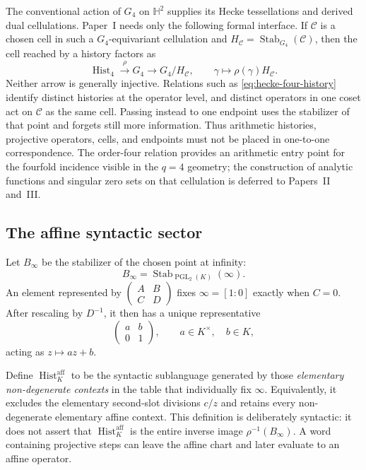 \begin{remark}
\label{rem:hecke-history-operator-coset}
The conventional action of $G_4$ on $\mathbb H^2$ supplies its Hecke
tessellations and derived dual cellulations.  Paper~I needs only the following
formal interface.  If $\mathcal C$ is a chosen cell in such a
$G_4$-equivariant cellulation and
\(H_{\mathcal C}=\operatorname{Stab}_{G_4}(\mathcal C)\), then the cell reached
by a history factors as
\begin{equation}
  \operatorname{Hist}_4
    \xrightarrow{\ \rho\ }G_4
    \longrightarrow G_4/H_{\mathcal C},
  \qquad
  \gamma\longmapsto\rho(\gamma)H_{\mathcal C}.
  \label{eq:hecke-history-coset-interface}
\end{equation}
Neither arrow is generally injective.  Relations such as
\eqref{eq:hecke-four-history} identify distinct histories at the operator
level, and distinct operators in one coset act on $\mathcal C$ as the same
cell.  Passing instead to one endpoint uses the stabilizer of that
point and forgets still more information.  Thus arithmetic histories,
projective operators, cells, and endpoints must not be placed in one-to-one
correspondence.  The order-four relation provides an arithmetic entry point
for the fourfold incidence visible in the $q=4$ geometry; the construction of
analytic functions and singular zero sets on that cellulation is deferred to
Papers~II and~III.
\end{remark}

\subsection{The affine syntactic sector}

Let $B_\infty$ be the stabilizer of the chosen point at infinity:
\[
  B_\infty
  =\operatorname{Stab}_{\operatorname{PGL}_2(K)}(\infty).
\]
An element represented by $\begin{pmatrix}A&B\\C&D\end{pmatrix}$ fixes
$\infty=[1:0]$ exactly when $C=0$.  After rescaling by $D^{-1}$, it then has a
unique representative
\[
  \begin{pmatrix}a&b\\0&1\end{pmatrix},
  \qquad a\in K^\times,\quad b\in K,
\]
acting as $z\mapsto az+b$.

Define $\operatorname{Hist}^{\mathrm{aff}}_K$ to be the syntactic sublanguage
generated by those \emph{elementary non-degenerate contexts} in the table that
individually fix $\infty$.  Equivalently, it excludes the elementary
second-slot divisions $c/z$ and retains every non-degenerate elementary affine
context.  This definition is deliberately syntactic: it does not assert that
$\operatorname{Hist}^{\mathrm{aff}}_K$ is the entire inverse image
$\rho^{-1}(B_\infty)$.  A word containing projective steps can leave the
affine chart and later evaluate to an affine operator.

